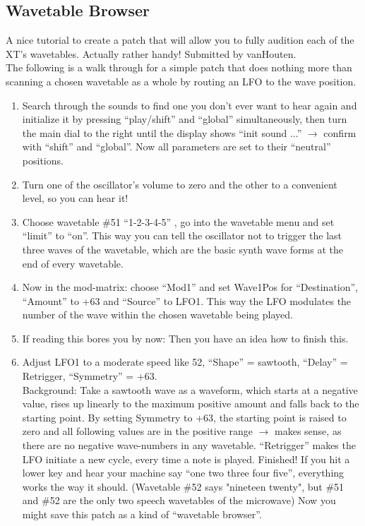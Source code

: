 \subsection{Wavetable Browser}
A nice tutorial to create a patch that will allow you to fully audition each of the XT's wavetables. Actually rather handy! Submitted by vanHouten.\\
The following is a walk through for a simple patch that does nothing more than scanning a chosen wavetable as a whole by routing an LFO to the wave position.
\begin{enumerate}
	\item Search through the sounds to find one you don't ever want to hear again and initialize it by pressing ``play/shift'' and ``global'' simultaneously, then turn the main dial to the right until the display shows ``init sound ...'' $\to$ confirm with ``shift'' and ``global''.
	Now all parameters are set to their ``neutral'' positions. 
	\item Turn one of the oscillator's volume to zero and the other to a convenient level, so you can hear it!
	\item Choose wavetable \#51 ``1-2-3-4-5'' , go into the wavetable menu and set ``limit'' to ``on''. This way you can tell the oscillator not to trigger the last three waves of the wavetable, which are the basic synth wave forms at the end of every wavetable.
	\item Now in the mod-matrix: choose ``Mod1'' and set Wave1Pos for ``Destination'', ``Amount'' to +63 and ``Source'' to LFO1. This way the LFO modulates the number of the wave within the chosen wavetable being played.
	\item If reading this bores you by now: Then you have an idea how to finish this.
	\item Adjust LFO1 to a moderate speed like 52, ``Shape'' = sawtooth, ``Delay'' = Retrigger, ``Symmetry'' = +63.\\
	Background: Take a sawtooth wave as a waveform, which starts at a negative value, rises up linearly to the maximum positive amount and falls back to the starting point. By setting Symmetry to +63, the starting point is raised to zero and all following values are in the positive range $\to$ makes sense, as there are no negative wave-numbers in any wavetable. ``Retrigger'' makes the LFO initiate a new cycle, every time a note is played. Finished! If you hit a lower key and hear your machine say ``one two three four five'', everything works the way it should. (Wavetable \#52 says "nineteen twenty", but \#51 and \#52 are the only two speech wavetables of the microwave) Now you might save this patch as a kind of ``wavetable browser''.

\end{enumerate}
